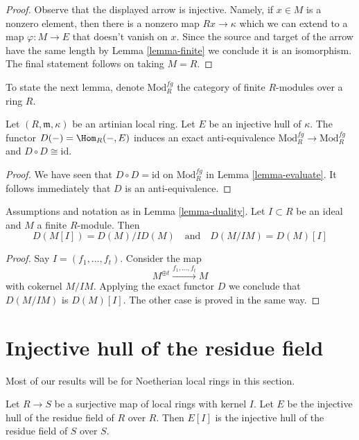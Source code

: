 \begin{proof}
Observe that the displayed arrow is injective. Namely, if $x \in M$ is
a nonzero element, then there is a nonzero map $Rx \to \kappa$ which
we can extend to a map $\varphi : M \to E$ that doesn't vanish on $x$.
Since the source and target of the arrow have the same length by
Lemma \ref{lemma-finite}
we conclude it is an isomorphism. The final statement follows
on taking $M = R$.
\end{proof}

\noindent
To state the next lemma, denote $\text{Mod}^{fg}_R$ the category of finite
$R$-modules over a ring $R$.

\begin{lemma}
\label{lemma-duality}
Let $(R, \mathfrak m, \kappa)$ be an artinian local ring.
Let $E$ be an injective hull of $\kappa$.
The functor $D(-) = \Hom_R(-, E)$ induces an exact anti-equivalence
$\text{Mod}^{fg}_R \to \text{Mod}^{fg}_R$ and
$D \circ D \cong \text{id}$.
\end{lemma}

\begin{proof}
We have seen that $D \circ D = \text{id}$ on $\text{Mod}^{fg}_R$
in Lemma \ref{lemma-evaluate}. It follows immediately that
$D$ is an anti-equivalence.
\end{proof}

\begin{lemma}
\label{lemma-duality-torsion-cotorsion}
Assumptions and notation as in Lemma \ref{lemma-duality}.
Let $I \subset R$ be an ideal and $M$ a finite $R$-module.
Then
$$
D(M[I]) = D(M)/ID(M) \quad\text{and}\quad D(M/IM) = D(M)[I]
$$
\end{lemma}

\begin{proof}
Say $I = (f_1, \ldots, f_t)$. Consider the map
$$
M^{\oplus t} \xrightarrow{f_1, \ldots, f_t} M
$$
with cokernel $M/IM$. Applying the exact functor $D$ we conclude that
$D(M/IM)$ is $D(M)[I]$. The other case is proved in the same way.
\end{proof}



\section{Injective hull of the residue field}
\label{section-hull-residue-field}

\noindent
Most of our results will be for Noetherian local rings in this section.

\begin{lemma}
\label{lemma-quotient}
Let $R \to S$ be a surjective map of local rings with kernel $I$.
Let $E$ be the injective hull of the residue field of $R$ over $R$.
Then $E[I]$ is the injective hull of the residue field of $S$ over $S$.
\end{lemma}

